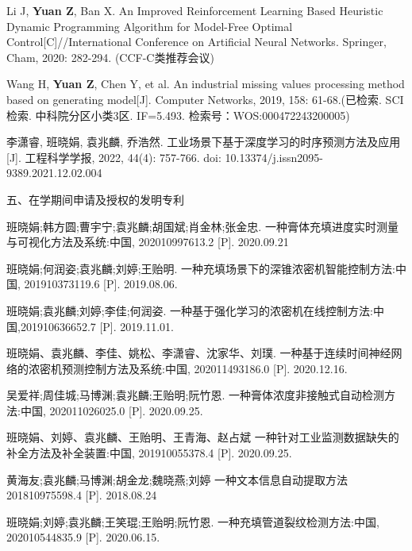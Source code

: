 \begin{enumerate}[label={[\arabic*]}]
\item Li J, \textbf{Yuan Z}, Ban X. An Improved Reinforcement Learning Based Heuristic Dynamic Programming Algorithm for Model-Free Optimal Control[C]//International Conference on Artificial Neural Networks. Springer, Cham, 2020: 282-294. (CCF-C类推荐会议) 
\item Wang H, \textbf{Yuan Z}, Chen Y, et al. An industrial missing values processing method based on generating model[J]. Computer Networks, 2019, 158: 61-68.(已检索. SCI检索. 中科院分区小类3区. IF=5.493. 检索号：WOS:000472243200005)
\item 李潇睿, 班晓娟, 袁兆麟, 乔浩然. 工业场景下基于深度学习的时序预测方法及应用[J]. 工程科学学报, 2022, 44(4): 757-766. doi: 10.13374/j.issn2095-9389.2021.12.02.004
\end{enumerate}
\par
\noindent 五、在学期间申请及授权的发明专利 \par

\begin{enumerate}[label={[\arabic*]}]  %
\item 班晓娟;韩方圆;曹宇宁;袁兆麟;胡国斌;肖金林;张金忠. 一种膏体充填进度实时测量与可视化方法及系统:中国, 202010997613.2 [P]. 2020.09.21 
 \item 班晓娟;何润姿;袁兆麟;刘婷;王贻明. 一种充填场景下的深锥浓密机智能控制方法:中国, 201910373119.6 [P]. 2019.08.06. 
 \item 班晓娟;袁兆麟;刘婷;李佳;何润姿. 一种基于强化学习的浓密机在线控制方法:中国,201910636652.7 [P]. 2019.11.01. 
 \item 班晓娟、袁兆麟、李佳、姚松、李潇睿、沈家华、刘璞. 一种基于连续时间神经网络的浓密机预测控制方法及系统:中国, 202011493186.0 [P]. 2020.12.16. 
\item 吴爱祥;周佳城;马博渊;袁兆麟;王贻明;阮竹恩. 一种膏体浓度非接触式自动检测方法:中国, 202011026025.0 [P]. 2020.09.25. 
\item 班晓娟、刘婷、袁兆麟、王贻明、王青海、赵占斌 一种针对工业监测数据缺失的补全方法及补全装置:中国, 201910055378.4 [P]. 2020.09.25. 
\item 黄海友;袁兆麟;马博渊;胡金龙;魏晓燕;刘婷 一种文本信息自动提取方法201810975598.4 [P]. 2018.08.24 
 \item 班晓娟;刘婷;袁兆麟;王笑琨;王贻明;阮竹恩. 一种充填管道裂纹检测方法:中国, 202010544835.9 [P]. 2020.06.15.
\end{enumerate}

